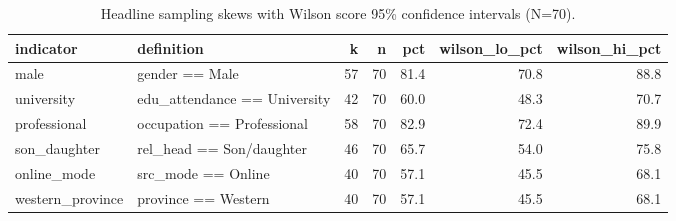 \begin{table}
\caption{Headline sampling skews with Wilson score 95\% confidence intervals (N=70).}
\label{tab:sampling_skews}
\begin{tabular}{llrrrrr}
\toprule
indicator & definition & k & n & pct & wilson\_lo\_pct & wilson\_hi\_pct \\
\midrule
male & gender == Male & 57 & 70 & 81.4 & 70.8 & 88.8 \\
university & edu\_attendance == University & 42 & 70 & 60.0 & 48.3 & 70.7 \\
professional & occupation == Professional & 58 & 70 & 82.9 & 72.4 & 89.9 \\
son\_daughter & rel\_head == Son/daughter & 46 & 70 & 65.7 & 54.0 & 75.8 \\
online\_mode & src\_mode == Online & 40 & 70 & 57.1 & 45.5 & 68.1 \\
western\_province & province == Western & 40 & 70 & 57.1 & 45.5 & 68.1 \\
\bottomrule
\end{tabular}
\end{table}
